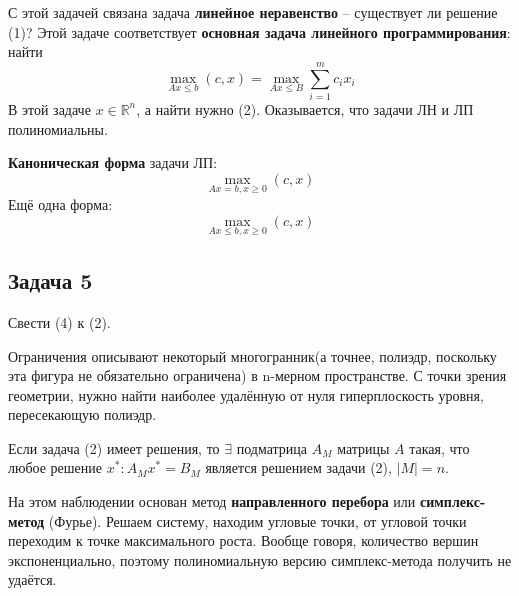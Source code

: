 \documentclass[11pt]{article}
\newcounter{th}\setcounter{th}{0}
\newcounter{stnmt}\setcounter{stnmt}{0}
\def\st{\par\smallskip\refstepcounter{stnmt}\textbf{\arabic{stnmt}}}
\newtheorem*{Statement}{Утверждение \st}
\begin{document}
С этой задачей связана задача \textbf{линейное неравенство} -- существует ли решение (1)?
Этой задаче соответствует \textbf{основная задача линейного программирования}: найти
\begin{equation}
\max_{Ax \leq b}(c, x) = \max_{Ax \leq B}\sum_{i = 1}^mc_ix_i
\end{equation}
В этой задаче $x \in \mathbb{R}^n$, а найти нужно (2).
Оказывается, что задачи ЛН и ЛП полиномиальны.

\textbf{Каноническая форма} задачи ЛП:
\begin{equation}
\max_{Ax = b, x \geq 0}(c, x)
\end{equation}
Ещё одна форма:
\begin{equation}
\max_{Ax \leq b, x \geq 0}(c, x)
\end{equation}
\subsection{Задача 5}
\label{sec:org1bc8b5a}
Свести (4) к (2).

Ограничения описывают некоторый многогранник(а точнее, полиэдр, поскольку эта фигура не
обязательно ограничена) в n-мерном пространстве. С точки зрения геометрии, нужно найти
наиболее удалённую от нуля гиперплоскость уровня, пересекающую полиэдр.

\begin{Statement}
Если задача (2) имеет решения, то $\exists$ подматрица $A_M$ матрицы $A$ такая, что любое
решение $x^*: A_Mx^* = B_M$ является решением задачи (2), $|M| = n$.
\end{Statement}
На этом наблюдении основан метод \textbf{направленного перебора} или \textbf{симплекс-метод} (Фурье).
Решаем систему, находим угловые точки, от угловой точки переходим к точке максимального роста.
Вообще говоря, количество вершин экспоненциально, поэтому полиномиальную версию симплекс-метода
получить не удаётся.
\end{document}
